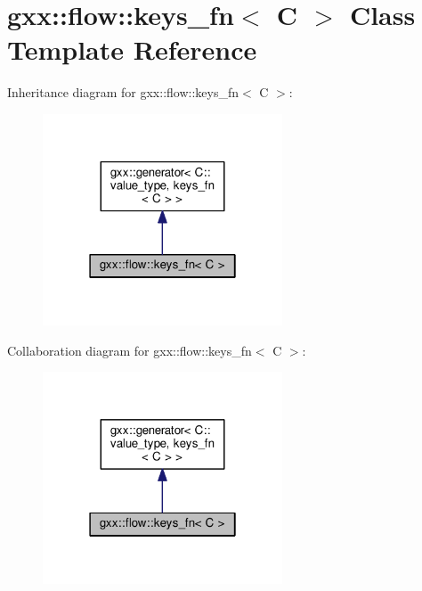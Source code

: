 \hypertarget{classgxx_1_1flow_1_1keys__fn}{}\section{gxx\+:\+:flow\+:\+:keys\+\_\+fn$<$ C $>$ Class Template Reference}
\label{classgxx_1_1flow_1_1keys__fn}


Inheritance diagram for gxx\+:\+:flow\+:\+:keys\+\_\+fn$<$ C $>$\+:
\nopagebreak
\begin{figure}[H]
\begin{center}
\leavevmode
\includegraphics[width=202pt]{classgxx_1_1flow_1_1keys__fn__inherit__graph}
\end{center}
\end{figure}


Collaboration diagram for gxx\+:\+:flow\+:\+:keys\+\_\+fn$<$ C $>$\+:
\nopagebreak
\begin{figure}[H]
\begin{center}
\leavevmode
\includegraphics[width=202pt]{classgxx_1_1flow_1_1keys__fn__coll__graph}
\end{center}
\end{figure}
